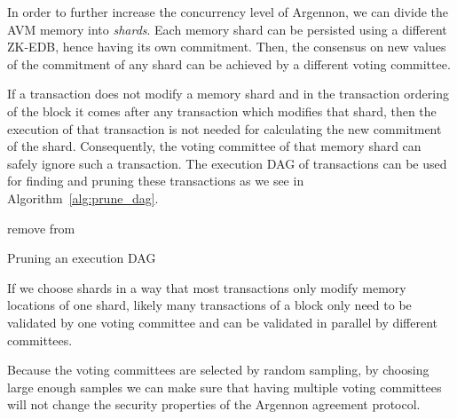 In order to further increase the concurrency level of Argennon, we can divide the AVM memory into \emph{shards}.
Each memory shard can be persisted using a different ZK-EDB, hence having its own commitment. Then, the
consensus on new values of the commitment of any shard can be achieved by a different voting committee.

If a transaction does not modify a memory shard and in the transaction ordering of the block it comes after
any transaction which modifies that shard, then the execution of that transaction is not needed for calculating
the new commitment of the shard. Consequently, the voting committee of that memory shard can safely ignore such a
transaction. The execution DAG of transactions can be used for finding and pruning these transactions as
we see in Algorithm~\ref{alg:prune_dag}.

\begin{algorithm}
    \DontPrintSemicolon
    \BlankLine
    {
        \RPrune{\V}\;
    }
    \BlankLine
    \Fn{\RPrune{\V}}
    {
        {
            remove \V from \Graph\;
            {
                \;
            }
        }
    }
    \caption{Pruning an execution DAG}\label{alg:prune_dag}
\end{algorithm}

If we choose shards in a way that most transactions only modify memory locations of one shard,
likely many transactions of a block only need to be validated by one voting committee and can be validated in
parallel by different committees.

Because the voting committees are selected by random sampling, by choosing large enough samples we can make sure
that having multiple voting committees will not change the security properties of the Argennon agreement protocol.